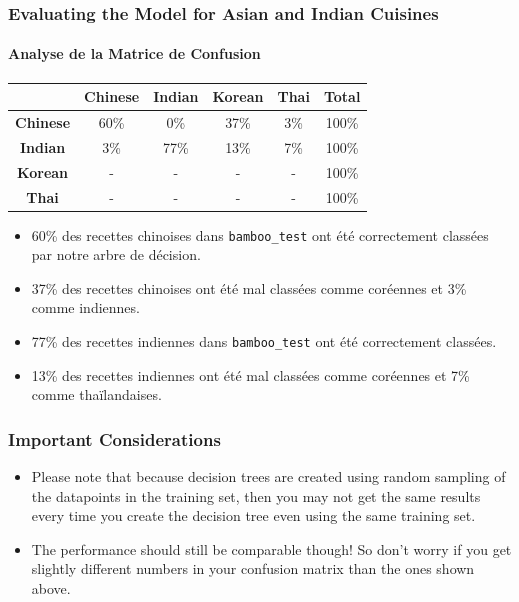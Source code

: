 \documentclass{beamer}
\begin{document}
	\begin{frame}	
		\frametitle{Evaluating the Model for Asian and Indian Cuisines}
		\framesubtitle{Analyse de la Matrice de Confusion}
		\begin{center}
			\begin{tabular}{c|ccccc}
				& \textbf{Chinese} & \textbf{Indian} & \textbf{Korean} & \textbf{Thai} & \textbf{Total} \\ \hline
				\textbf{Chinese} & 60\% & 0\% & 37\% & 3\% & 100\% \\
				\textbf{Indian} & 3\% & 77\% & 13\% & 7\% & 100\% \\
				\textbf{Korean} & - & - & - & - & 100\% \\
				\textbf{Thai} & - & - & - & - & 100\%
			\end{tabular}
		\end{center}
		
		\begin{itemize}
			\item 60\% des recettes chinoises dans \texttt{bamboo\_test} ont été correctement classées par notre arbre de décision.
			\item 37\% des recettes chinoises ont été mal classées comme coréennes et 3\% comme indiennes.
			\item 77\% des recettes indiennes dans \texttt{bamboo\_test} ont été correctement classées.
			\item 13\% des recettes indiennes ont été mal classées comme coréennes et 7\% comme thaïlandaises.
		\end{itemize}
	\end{frame}

\begin{frame}
	\frametitle{Important Considerations}
	
	\begin{itemize}
		\item Please note that because decision trees are created using random sampling of the datapoints in the training set, then you may not get the same results every time you create the decision tree even using the same training set.
		\item The performance should still be comparable though! So don't worry if you get slightly different numbers in your confusion matrix than the ones shown above.
	\end{itemize}
\end{frame}
\end{document}
